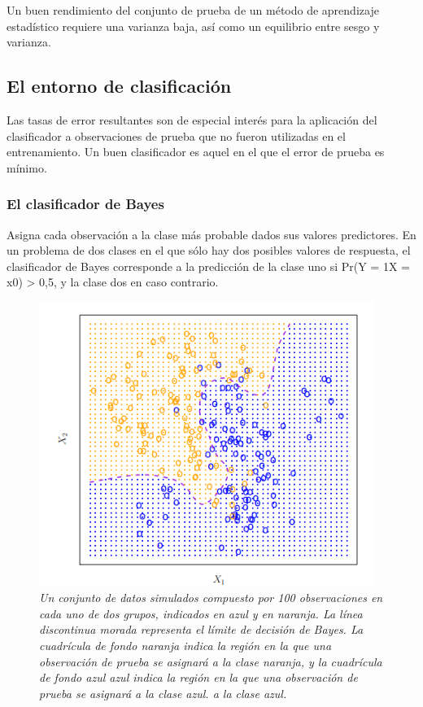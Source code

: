 \documentclass[
  letterpaper,
  DIV=11,
  numbers=noendperiod]{scrartcl}
\begin{document}
Un buen rendimiento del conjunto de prueba de un método de aprendizaje
estadístico requiere una varianza baja, así como un equilibrio entre
sesgo y varianza.

\hypertarget{el-entorno-de-clasificaciuxf3n}{%
\subsection{El entorno de
clasificación}\label{el-entorno-de-clasificaciuxf3n}}

Las tasas de error resultantes son de especial interés para la
aplicación del clasificador a observaciones de prueba que no fueron
utilizadas en el entrenamiento. Un buen clasificador es aquel en el que
el error de prueba es mínimo.

\hypertarget{el-clasificador-de-bayes}{%
\subsubsection{El clasificador de
Bayes}\label{el-clasificador-de-bayes}}

Asigna cada observación a la clase más probable dados sus valores
predictores. En un problema de dos clases en el que sólo hay dos
posibles valores de respuesta, el clasificador de Bayes corresponde a la
predicción de la clase uno si Pr(Y = 1\textbar X = x0) \textgreater{}
0,5, y la clase dos en caso contrario.

\begin{figure}

{\centering \includegraphics[width=4.28125in,height=\textheight]{images/bayes.png}

}

\caption{\emph{Un conjunto de datos simulados compuesto por 100
observaciones en cada uno de dos grupos, indicados en azul y en naranja.
La línea discontinua morada representa el límite de decisión de Bayes.
La cuadrícula de fondo naranja indica la región en la que una
observación de prueba se asignará a la clase naranja, y la cuadrícula de
fondo azul azul indica la región en la que una observación de prueba se
asignará a la clase azul. a la clase azul.}}

\end{figure}
\end{document}
